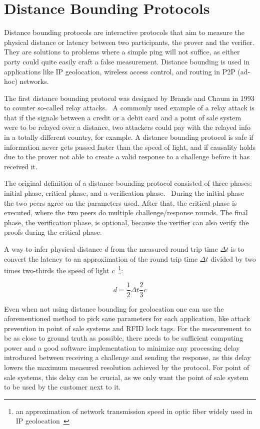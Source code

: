\section{Distance Bounding Protocols}

Distance bounding protocols are interactive protocols that aim to measure the physical distance or latency between two participants, the prover and the verifier. They are solutions to problems where a simple ping will not suffice, as either party could quite easily craft a false measurement. Distance bounding is used in applications like IP geolocation, wireless access control, and routing in P2P (ad-hoc) networks.

The first distance bounding protocol was designed by Brands and Chaum in 1993 to counter so-called relay attacks.~\cite{Boureanu_undated-bn, Brands1994-hz} A commonly used example of a relay attack is that if the signals between a credit or a debit card and a point of sale system were to be relayed over a distance, two attackers could pay with the relayed info in a totally different country, for example. A distance bounding protocol is safe if information never gets passed faster than the speed of light, and if causality holds due to the prover not able to create a valid response to a challenge before it has received it.~\cite{Boureanu_undated-bn}

The original definition of a distance bounding protocol consisted of three phases: initial phase, critical phase, and a verification phase.~\cite{Brands1994-hz, Mauw2018-uz} During the initial phase the two peers agree on the parameters used. After that, the critical phase is executed, where the two peers do multiple challenge/response rounds. The final phase, the verification phase, is optional, because the verifier can also verify the proofs during the critical phase.

A way to infer physical distance \(d\) from the measured round trip time \(\Delta t\) is to convert the latency to an approximation of the round trip time \(\Delta t\) divided by two times two-thirds the speed of light \(c\)~\footnote{an approximation of network transmission speed in optic fiber widely used in IP geolocation~\cite{Candela2020-am}}:

\begin{equation*}
  d = \frac{1}{2}\Delta t \frac{2}{3}c
\end{equation*}

Even when not using distance bounding for geolocation one can use the aforementioned method to pick sane parameters for each application, like attack prevention in point of sale systems and RFID lock tags. For the measurement to be as close to ground truth as possible, there needs to be sufficient computing power and a good software implementation to minimize any processing delay introduced between receiving a challenge and sending the response, as this delay lowers the maximum measured resolution achieved by the protocol. For point of sale systems, this delay can be crucial, as we only want the point of sale system to be used by the customer next to it.

